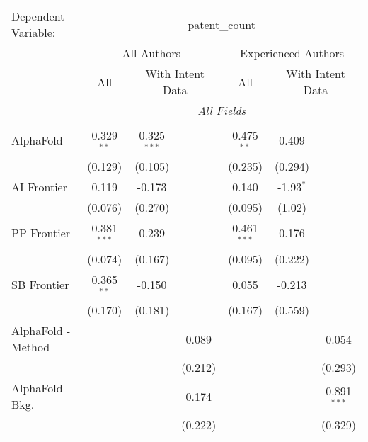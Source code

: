 \begingroup
\centering
\begin{tabular}{lcccccc}
   \tabularnewline \midrule \midrule
   Dependent Variable: & \multicolumn{6}{c}{patent\_count}\\
 & \multicolumn{3}{c}{All Authors} & \multicolumn{3}{c}{Experienced Authors} \\
\cmidrule(lr){2-4} \cmidrule(lr){5-7}
 & \multicolumn{1}{c}{All} & \multicolumn{2}{c}{With Intent Data} & \multicolumn{1}{c}{All} & \multicolumn{2}{c}{With Intent Data} \\
\cmidrule(lr){2-2} \cmidrule(lr){3-4} \cmidrule(lr){5-5} \cmidrule(lr){6-7}
 & \multicolumn{6}{c}{\textit{All Fields}} \\ \\
   AlphaFold                     & 0.329$^{**}$  & 0.325$^{***}$ &              & 0.475$^{**}$  & 0.409       &   \\   
                                 & (0.129)       & (0.105)       &              & (0.235)       & (0.294)     &   \\   
   AI Frontier                   & 0.119         & -0.173        &              & 0.140         & -1.93$^{*}$ &   \\   
                                 & (0.076)       & (0.270)       &              & (0.095)       & (1.02)      &   \\   
   PP Frontier                   & 0.381$^{***}$ & 0.239         &              & 0.461$^{***}$ & 0.176       &   \\   
                                 & (0.074)       & (0.167)       &              & (0.095)       & (0.222)     &   \\   
   SB Frontier                   & 0.365$^{**}$  & -0.150        &              & 0.055         & -0.213      &   \\   
                                 & (0.170)       & (0.181)       &              & (0.167)       & (0.559)     &   \\   
   AlphaFold - Method            &               &               & 0.089        &               &             & 0.054\\   
                                 &               &               & (0.212)      &               &             & (0.293)\\   
   AlphaFold - Bkg.              &               &               & 0.174        &               &             & 0.891$^{***}$\\   
                                 &               &               & (0.222)      &               &             & (0.329)\\   

\end{tabular}
